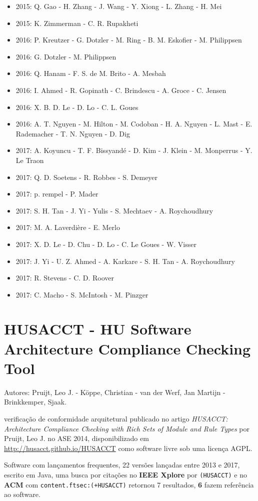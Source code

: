 \begin{itemize}
\item 2015: Q. Gao - H. Zhang - J. Wang - Y. Xiong - L. Zhang - H. Mei
\item 2015: K. Zimmerman - C. R. Rupakheti
\item 2016: P. Kreutzer - G. Dotzler - M. Ring - B. M. Eskofier - M. Philippsen
\item 2016: G. Dotzler - M. Philippsen
\item 2016: Q. Hanam - F. S. de M. Brito - A. Mesbah
\item 2016: I. Ahmed - R. Gopinath - C. Brindescu - A. Groce - C. Jensen
\item 2016: X. B. D. Le - D. Lo - C. L. Goues
\item 2016: A. T. Nguyen - M. Hilton - M. Codoban - H. A. Nguyen - L. Mast - E. Rademacher - T. N. Nguyen - D. Dig
\item 2017: A. Koyuncu - T. F. Bissyand{\'e} - D. Kim - J. Klein - M. Monperrus - Y. Le Traon
\item 2017: Q. D. Soetens - R. Robbes - S. Demeyer
\item 2017: p. rempel - P. Mader
\item 2017: S. H. Tan - J. Yi - Yulis - S. Mechtaev - A. Roychoudhury
\item 2017: M. A. Laverdière - E. Merlo
\item 2017: X. D. Le - D. Chu - D. Lo - C. Le Goues - W. Visser
\item 2017: J. Yi - U. Z. Ahmed - A. Karkare - S. H. Tan - A. Roychoudhury
\item 2017: R. Stevens - C. D. Roover
\item 2017: C. Macho - S. McIntosh - M. Pinzger
\end{itemize}

\section{HUSACCT - HU Software Architecture Compliance Checking Tool}

Autores:
Pruijt, Leo J. - K\"{o}ppe, Christian - van der Werf, Jan Martijn - Brinkkemper, Sjaak.

verificação de conformidade arquitetural
publicado no artigo {\it HUSACCT: Architecture Compliance Checking with Rich Sets of Module and Rule Types}
por Pruijt, Leo J.
no ASE 2014,
disponibilizado em \url{http://husacct.github.io/HUSACCT}
como software livre
sob uma licença AGPL.

Software com lançamentos frequentes,
22 versões lançadas
entre 2013 e 2017,
escrito em Java,
uma busca por citações no {\bf IEEE Xplore} por
\texttt{(HUSACCT)}
e no {\bf ACM} com
\texttt{content.ftsec:(+HUSACCT)}
retornou
7 resultados,
{\bf 6} fazem referência ao software.

